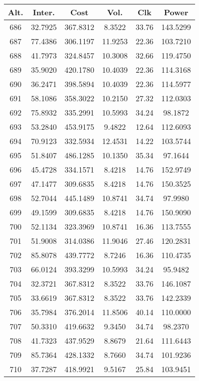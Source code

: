 \begin{center}
\begin{footnotesize}
\begin{tabular}{|c|ccccc|}
\hline
Alt. & Inter. & Cost & Vol. & Clk & Power\\
\hline
686 & 32.7925 & 367.8312 & 8.3522 & 33.76 & 143.5299 \\
687 & 77.4386 & 306.1197 & 11.9253 & 22.36 & 103.7210 \\
688 & 41.7973 & 324.8457 & 10.3008 & 32.66 & 119.4750 \\
689 & 35.9020 & 420.1780 & 10.4039 & 22.36 & 114.3168 \\
690 & 36.2471 & 398.5894 & 10.4039 & 22.36 & 114.5977 \\
691 & 58.1086 & 358.3022 & 10.2150 & 27.32 & 112.0303 \\
692 & 75.8932 & 335.2991 & 10.5993 & 34.24 & 98.1872 \\
693 & 53.2840 & 453.9175 & 9.4822 & 12.64 & 112.6093 \\
694 & 70.9123 & 332.5934 & 12.4531 & 14.22 & 103.5744 \\
695 & 51.8407 & 486.1285 & 10.1350 & 35.34 & 97.1644 \\
696 & 45.4728 & 334.1571 & 8.4218 & 14.76 & 152.9749 \\
697 & 47.1477 & 309.6835 & 8.4218 & 14.76 & 150.3525 \\
698 & 52.7044 & 445.1489 & 10.8741 & 34.74 & 97.9980 \\
699 & 49.1599 & 309.6835 & 8.4218 & 14.76 & 150.9090 \\
700 & 52.1134 & 323.3969 & 10.8741 & 16.36 & 113.7555 \\
701 & 51.9008 & 314.0386 & 11.9046 & 27.46 & 120.2831 \\
702 & 85.8078 & 439.7772 & 8.7246 & 16.36 & 110.4735 \\
703 & 66.0124 & 393.3299 & 10.5993 & 34.24 & 95.9482 \\
704 & 32.3721 & 367.8312 & 8.3522 & 33.76 & 146.1087 \\
705 & 33.6619 & 367.8312 & 8.3522 & 33.76 & 142.2339 \\
706 & 35.7984 & 376.2014 & 11.8506 & 40.14 & 110.0000 \\
707 & 50.3310 & 419.6632 & 9.3450 & 34.74 & 98.2370 \\
708 & 41.7323 & 437.9529 & 8.8679 & 21.64 & 111.6443 \\
709 & 85.7364 & 428.1332 & 8.7660 & 34.74 & 101.9236 \\
710 & 37.7287 & 418.9921 & 9.5167 & 25.84 & 103.9451 \\

\end{tabular}
\end{footnotesize}
\end{center}
